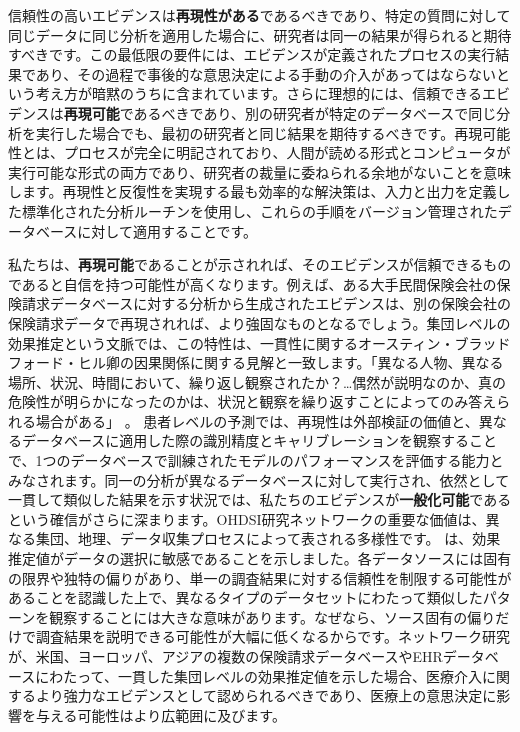 \documentclass[
  11pt]{book}
\theoremstyle{definition}
\theoremstyle{definition}
\theoremstyle{definition}
\theoremstyle{definition}
\theoremstyle{remark}
\begin{document}
信頼性の高いエビデンスは\textbf{再現性がある}であるべきであり、特定の質問に対して同じデータに同じ分析を適用した場合に、研究者は同一の結果が得られると期待すべきです。この最低限の要件には、エビデンスが定義されたプロセスの実行結果であり、その過程で事後的な意思決定による手動の介入があってはならないという考え方が暗黙のうちに含まれています。さらに理想的には、信頼できるエビデンスは\textbf{再現可能}であるべきであり、別の研究者が特定のデータベースで同じ分析を実行した場合でも、最初の研究者と同じ結果を期待するべきです。再現可能性とは、プロセスが完全に明記されており、人間が読める形式とコンピュータが実行可能な形式の両方であり、研究者の裁量に委ねられる余地がないことを意味します。再現性と反復性を実現する最も効率的な解決策は、入力と出力を定義した標準化された分析ルーチンを使用し、これらの手順をバージョン管理されたデータベースに対して適用することです。

私たちは、\textbf{再現可能}であることが示されれば、そのエビデンスが信頼できるものであると自信を持つ可能性が高くなります。例えば、ある大手民間保険会社の保険請求データベースに対する分析から生成されたエビデンスは、別の保険会社の保険請求データで再現されれば、より強固なものとなるでしょう。集団レベルの効果推定という文脈では、この特性は、一貫性に関するオースティン・ブラッドフォード・ヒル卿の因果関係に関する見解と一致します。「異なる人物、異なる場所、状況、時間において、繰り返し観察されたか？\ldots 偶然が説明なのか、真の危険性が明らかになったのかは、状況と観察を繰り返すことによってのみ答えられる場合がある」\citep{hill_1965} 。 患者レベルの予測では、再現性は外部検証の価値と、異なるデータベースに適用した際の識別精度とキャリブレーションを観察することで、1つのデータベースで訓練されたモデルのパフォーマンスを評価する能力とみなされます。同一の分析が異なるデータベースに対して実行され、依然として一貫して類似した結果を示す状況では、私たちのエビデンスが\textbf{一般化可能}であるという確信がさらに深まります。OHDSI研究ネットワークの重要な価値は、異なる集団、地理、データ収集プロセスによって表される多様性です。 \citet{madigan_2013} は、効果推定値がデータの選択に敏感であることを示しました。各データソースには固有の限界や独特の偏りがあり、単一の調査結果に対する信頼性を制限する可能性があることを認識した上で、異なるタイプのデータセットにわたって類似したパターンを観察することには大きな意味があります。なぜなら、ソース固有の偏りだけで調査結果を説明できる可能性が大幅に低くなるからです。ネットワーク研究が、米国、ヨーロッパ、アジアの複数の保険請求データベースやEHRデータベースにわたって、一貫した集団レベルの効果推定値を示した場合、医療介入に関するより強力なエビデンスとして認められるべきであり、医療上の意思決定に影響を与える可能性はより広範囲に及びます。
\end{document}
